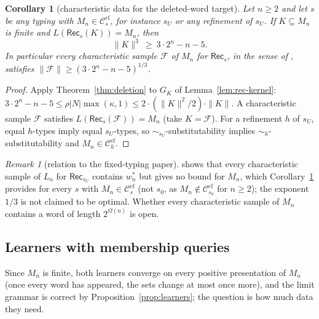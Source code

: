 \documentclass[11pt]{article}
\numberwithin{equation}{section}
\theoremstyle{plain}
\newtheorem{corollary}[theorem]{Corollary}
\theoremstyle{definition}
\theoremstyle{remark}
\newtheorem{remark}[theorem]{Remark}
\theoremstyle{plain}
\newcommand{\Ccf}[1]{\mathcal C^{\mathrm{cf}}_{#1}}
\begin{document}
\begin{corollary}[characteristic data for the deleted-word target]
\label{cor:rec-data}
Let $n\ge2$ and let $s$ be any typing with $M_n\in\Ccf s$, for instance
$s_U$ \citep[Prop.~6.4(iv)]{kuriyama-tcs1} or any refinement of $s_U$.  If
$K\subseteq M_n$ is finite and $L(\mathsf{Rec}_s(K))=M_n$, then
\[
\|K\|^3\ \ge\ 3\cdot2^n-n-5 .
\]
In particular every characteristic sample $\mathcal F$ of $M_n$ for
$\mathsf{Rec}_s$, in the sense of \citet[Sec.~2]{kuriyama-tcs1}, satisfies
$\|\mathcal F\|\ge(3\cdot2^n-n-5)^{1/3}$.
\end{corollary}
\begin{proof}
Apply Theorem~\ref{thm:deletion} to $G_K$ of Lemma~\ref{lem:rec-kernel}:
$3\cdot2^n-n-5\le\rho|N|\max(\kappa,1)\le2\cdot(\|K\|^2/2)\cdot\|K\|$.
A characteristic sample $\mathcal F$ satisfies
$L(\mathsf{Rec}_s(\mathcal F))=M_n$ (take $K=\mathcal F$).  For a refinement
$h$ of $s_U$, equal $h$-types imply equal $s_U$-types, so
$\sim_{s_U}$-substitutability implies $\sim_h$-substitutability and
$M_n\in\Ccf h$.
\end{proof}

\begin{remark}[relation to the fixed-typing paper]\label{rem:rec-data}
\citet[Prop.~6.4]{kuriyama-tcs1} shows that every characteristic sample of
$L_n$ for $\mathsf{Rec}_{s_U}$ contains $w^*_n$ but gives no bound for $M_n$,
which Corollary~\ref{cor:rec-data} provides for every $s$ with $M_n\in\Ccf s$
(not $s_0$, as $M_n\notin\Ccf{s_0}$ for $n\ge2$); the exponent $1/3$ is not
claimed to be optimal.  Whether every characteristic sample of $M_n$
contains a word of length $2^{\Omega(n)}$ is open.
\end{remark}

\subsection*{Learners with membership queries}

Since $M_n$ is finite, both learners converge on every positive
presentation of $M_n$ (once every word has appeared, the sets change at most
once more), and the limit grammar is correct by
Proposition~\ref{prop:learners}; the question is how much data they need.
\end{document}
